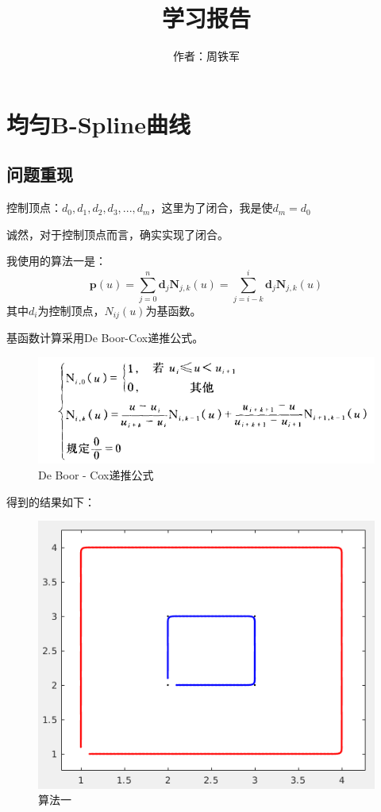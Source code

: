 \documentclass[12pt,a4paper]{article}
\title{学习报告}
\author{作者：周铁军}
\date{\chntoday}
\begin{document}
\maketitle
\newpage


\section{均匀B-Spline曲线}
\subsection{问题重现}

控制顶点：$d_0,d_1,d_2,d_3,...,d_m$，这里为了闭合，我是使$d_m=d_0$

诚然，对于控制顶点而言，确实实现了闭合。

我使用的算法一是：
\begin{equation}
\boldsymbol{p}(u)=\sum_{j=0}^{n} \boldsymbol{d}_{j} \mathbf{N}_{j, k}(u)=\sum_{j=i-k}^{i} \boldsymbol{d}_{j} \mathbf{N}_{j, k}(u)
\end{equation}
其中$d_i$为控制顶点，$N_{ij}(u)$为基函数。

基函数计算采用De Boor-Cox递推公式。
\begin{figure}[ht]
	\centering
	\includegraphics[scale=0.6]{./figures/D.png}
	\caption{De Boor - Cox递推公式}
	\label{fig:label}	
\end{figure}




得到的结果如下：
\begin{figure}[ht]
	\centering
	\includegraphics[scale=0.4]{./figures/false1.png}
	\caption{算法一}
	\label{fig:label}	
\end{figure}
\end{document}
